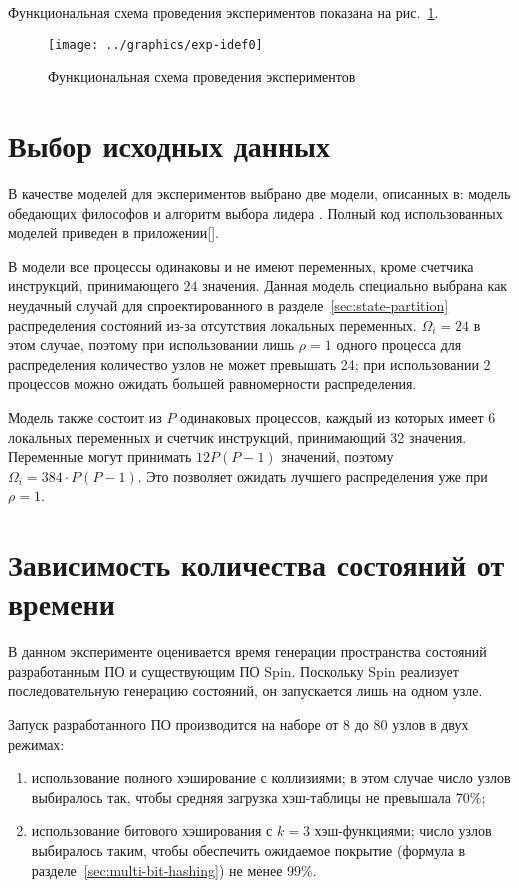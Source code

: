 Функциональная схема проведения экспериментов показана на рис.~\ref{fig:exp-idef0}.

\begin{figure}[ht]
  \centering
  \texttt{[image: ../graphics/exp-idef0]}
  \caption{Функциональная схема проведения экспериментов}
  \label{fig:exp-idef0}
\end{figure}

\section{Выбор исходных данных}
\label{sec:experiment-models}

В качестве моделей для экспериментов выбрано две модели, описанных в\cite{SPIN}: модель
обедающих философов  и алгоритм выбора лидера . Полный код
использованных моделей приведен в приложении[].

В модели  все процессы одинаковы и не имеют переменных, кроме счетчика
инструкций, принимающего $24$ значения. Данная модель специально выбрана как неудачный
случай для спроектированного в разделе~\ref{sec:state-partition} распределения состояний
из-за отсутствия локальных переменных. $\Omega_i = 24$ в этом случае, поэтому при
использовании лишь $\rho = 1$ одного процесса для распределения количество узлов не может
превышать 24; при использовании 2 процессов можно ожидать большей равномерности
распределения.

Модель  также состоит из $P$ одинаковых процессов, каждый из которых имеет
6 локальных переменных и счетчик инструкций, принимающий 32 значения. Переменные могут
принимать $12 P (P-1)$ значений, поэтому $\Omega_i = 384\cdot P (P - 1)$. Это позволяет
ожидать лучшего распределения уже при $\rho = 1$.

\section{Зависимость количества состояний от времени}
\label{sec:space-time}

В данном эксперименте оценивается время генерации пространства состояний разработанным ПО
и существующим ПО Spin. Поскольку Spin реализует последовательную генерацию состояний, он
запускается лишь на одном узле. 

Запуск разработанного ПО производится на наборе от 8 до 80 узлов в двух режимах:
\begin{enumerate}
\item использование полного хэширование с коллизиями; в этом случае число узлов выбиралось
  так, чтобы средняя загрузка хэш-таблицы не превышала 70\%;
\item использование битового хэширования с $k = 3$ хэш-функциями; число узлов выбиралось
  таким, чтобы обеспечить ожидаемое покрытие (формула в
  разделе~\ref{sec:multi-bit-hashing}) не менее 99\%.
\end{enumerate}

